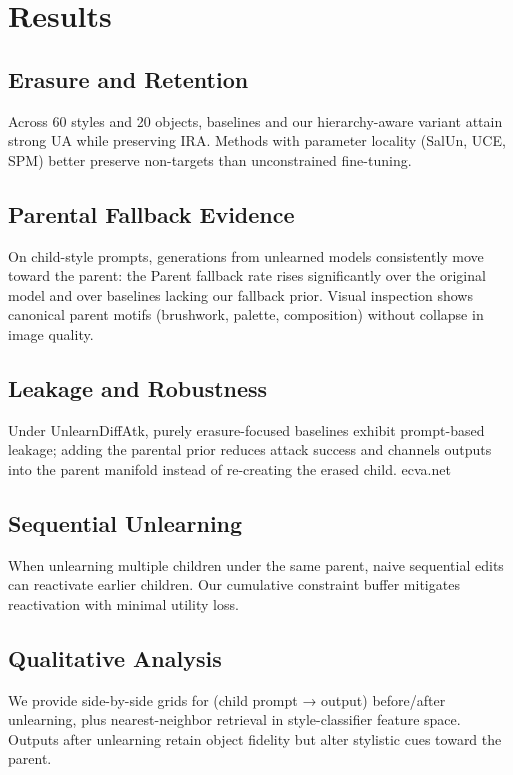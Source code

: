 \section{Results}

\subsection{Erasure and Retention}
Across 60 styles and 20 objects, baselines and our hierarchy-aware variant attain strong UA while preserving IRA. Methods with parameter locality (SalUn, UCE, SPM) better preserve non-targets than unconstrained fine-tuning.

\subsection{Parental Fallback Evidence}
On child-style prompts, generations from unlearned models consistently move toward the parent: the Parent fallback rate rises significantly over the original model and over baselines lacking our fallback prior. Visual inspection shows canonical parent motifs (brushwork, palette, composition) without collapse in image quality.

\subsection{Leakage and Robustness}
Under UnlearnDiffAtk, purely erasure-focused baselines exhibit prompt-based leakage; adding the parental prior reduces attack success and channels outputs into the parent manifold instead of re-creating the erased child. 
ecva.net

\subsection{Sequential Unlearning}
When unlearning multiple children under the same parent, naive sequential edits can reactivate earlier children. Our cumulative constraint buffer mitigates reactivation with minimal utility loss.

\subsection{Qualitative Analysis}
We provide side-by-side grids for (child prompt → output) before/after unlearning, plus nearest-neighbor retrieval in style-classifier feature space. Outputs after unlearning retain object fidelity but alter stylistic cues toward the parent.
